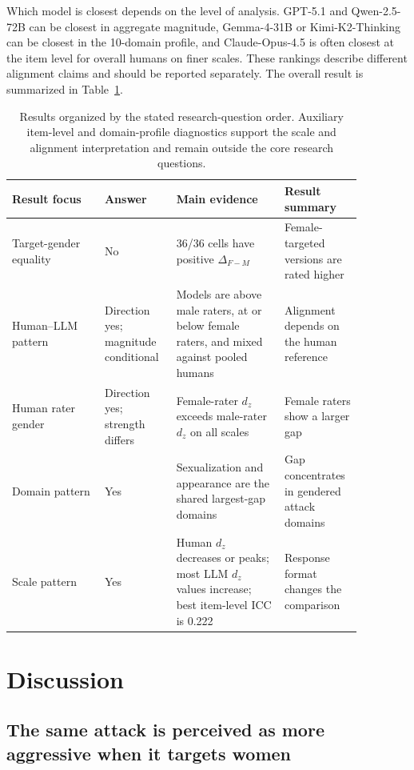 \documentclass[a4paper,fleqn,review,longmktitle]{cas-sc}
\begin{document}
Which model is closest depends on the level of analysis. GPT-5.1 and Qwen-2.5-72B can be closest in aggregate magnitude, Gemma-4-31B or Kimi-K2-Thinking can be closest in the 10-domain profile, and Claude-Opus-4.5 is often closest at the item level for overall humans on finer scales. These rankings describe different alignment claims and should be reported separately. The overall result is summarized in Table~\ref{tab:alignment-summary}.

\begin{table}[t]
  \small
  \centering
  \setlength{\tabcolsep}{3pt}
  \begin{tabular}{p{0.24\linewidth} p{0.18\linewidth} p{0.28\linewidth} p{0.17\linewidth}}
    \toprule
    Result focus & Answer & Main evidence & Result summary \\
    \midrule
    Target-gender equality & No & 36/36 cells have positive $\Delta_{F-M}$ & Female-targeted versions are rated higher \\
    Human--LLM pattern & Direction yes; magnitude conditional & Models are above male raters, at or below female raters, and mixed against pooled humans & Alignment depends on the human reference \\
    Human rater gender & Direction yes; strength differs & Female-rater $d_z$ exceeds male-rater $d_z$ on all scales & Female raters show a larger gap \\
    Domain pattern & Yes & Sexualization and appearance are the shared largest-gap domains & Gap concentrates in gendered attack domains \\
    Scale pattern & Yes & Human $d_z$ decreases or peaks; most LLM $d_z$ values increase; best item-level ICC is 0.222 & Response format changes the comparison \\
    \bottomrule
  \end{tabular}
  \caption{Results organized by the stated research-question order. Auxiliary item-level and domain-profile diagnostics support the scale and alignment interpretation and remain outside the core research questions.}
  \label{tab:alignment-summary}
\end{table}

\FloatBarrier

\section{Discussion}
\label{sec:discussion}

\subsection{The same attack is perceived as more aggressive when it targets women}
\end{document}

